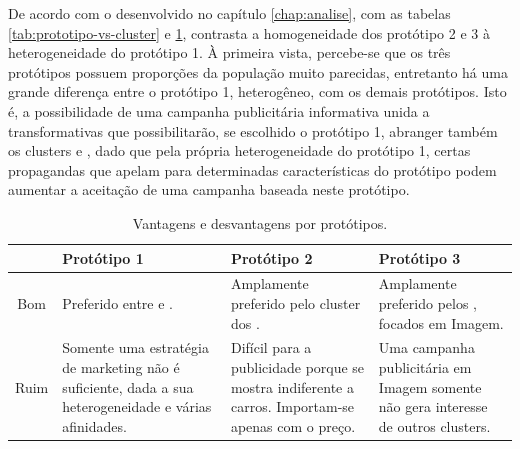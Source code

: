 \label{chap:conclusao}

De acordo com o desenvolvido no capítulo \ref{chap:analise}, com
as tabelas \ref{tab:prototipo-vs-cluster} e \ref{tab:prototipo-analise},
contrasta a homogeneidade dos protótipo 2 e 3 à heterogeneidade do
protótipo 1. À primeira vista, percebe-se que os três protótipos possuem
proporções da população muito parecidas, entretanto há uma grande
diferença entre o protótipo 1, heterogêneo, com os demais protótipos.
Isto é, a possibilidade de uma campanha publicitária informativa unida
a transformativas que possibilitarão, se escolhido o protótipo 1,
abranger também os clusters \nomeCc{} e \nomeCb{}, dado que pela
própria heterogeneidade do protótipo 1, certas propagandas que apelam
para determinadas características do protótipo podem aumentar a aceitação
de uma campanha baseada neste protótipo.

\begin{table}
\begin{centering}
\begin{tabular}{c|>{\centering}p{}|>{\centering}p{}|>{\centering}p{}}
\hline 
 & Protótipo 1 & Protótipo 2 & Protótipo 3\tabularnewline
\hline 
Bom & Preferido entre \nomeCa{} e \nomeCd{}. & Amplamente preferido pelo cluster dos \nomeCc{}. & Amplamente preferido pelos \nomeCb{}, focados em Imagem.\tabularnewline
\hline 
Ruim & Somente uma estratégia de marketing não é suficiente, dada a sua heterogeneidade
e várias afinidades. & Difícil para a publicidade porque se mostra indiferente a carros.
Importam-se apenas com o preço. & Uma campanha publicitária em Imagem somente não gera interesse de
outros clusters.\tabularnewline
\hline 
\end{tabular}
\par\end{centering}
\caption{\label{tab:prototipo-analise}Vantagens e desvantagens por protótipos.}
\end{table}

